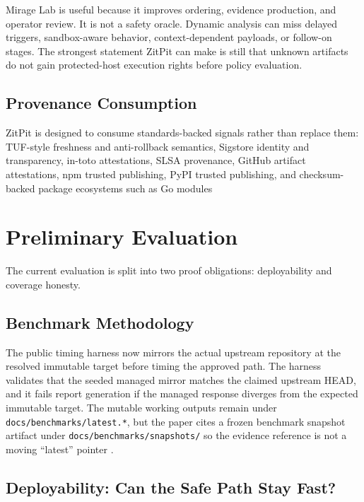 \documentclass[conference]{IEEEtran}
\newcommand{\product}{ZitPit}
\begin{document}
Mirage Lab is useful because it improves ordering, evidence production, and operator review. It is not a safety oracle. Dynamic analysis can miss delayed triggers, sandbox-aware behavior, context-dependent payloads, or follow-on stages. The strongest statement \product{} can make is still that unknown artifacts do not gain protected-host execution rights before policy evaluation.

\subsection{Provenance Consumption}

\product{} is designed to consume standards-backed signals rather than replace them: TUF-style freshness and anti-rollback semantics, Sigstore identity and transparency, in-toto attestations, SLSA provenance, GitHub artifact attestations, npm trusted publishing, PyPI trusted publishing, and checksum-backed package ecosystems such as Go modules \cite{tufDocs2026,tufPaper2016,sigstoreDocs2026,intotoDocs2026,intotoPaper2019,slsaDocs2026,githubArtifactAttestations2026,npmTrustedPublishing2026,pypiTrustedPublishing2026,pypiAttestations2026,goChecksum2026}

\section{Preliminary Evaluation}

The current evaluation is split into two proof obligations: deployability and coverage honesty.

\subsection{Benchmark Methodology}

The public timing harness now mirrors the actual upstream repository at the resolved immutable target before timing the approved path. The harness validates that the seeded managed mirror matches the claimed upstream HEAD, and it fails report generation if the managed response diverges from the expected immutable target. The mutable working outputs remain under \texttt{docs/benchmarks/latest.*}, but the paper cites a frozen benchmark snapshot artifact under \texttt{docs/benchmarks/snapshots/} so the evidence reference is not a moving ``latest'' pointer \cite{zitpitBench2026}.

\subsection{Deployability: Can the Safe Path Stay Fast?}
\end{document}
